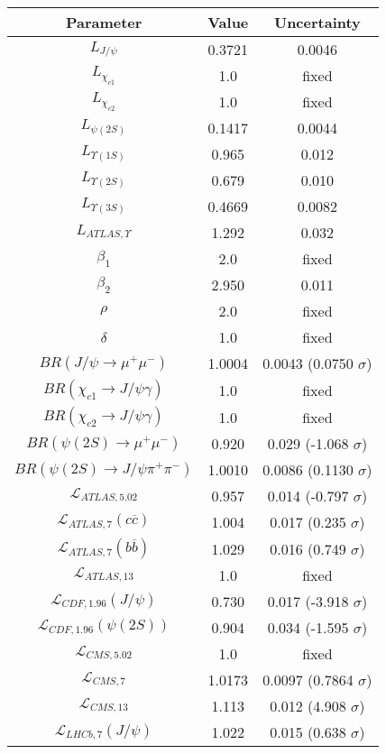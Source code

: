 \begin{table}[h!]
\centering
\begin{tabular}{c|c|c}
Parameter & Value & Uncertainty \\
\hline
$L_{J/\psi}$ & 0.3721 & 0.0046 \\
$L_{\chi_{c1}}$ & 1.0 & fixed \\
$L_{\chi_{c2}}$ & 1.0 & fixed \\
$L_{\psi(2S)}$ & 0.1417 & 0.0044 \\
$L_{\Upsilon(1S)}$ & 0.965 & 0.012 \\
$L_{\Upsilon(2S)}$ & 0.679 & 0.010 \\
$L_{\Upsilon(3S)}$ & 0.4669 & 0.0082 \\
$L_{ATLAS,\Upsilon}$ & 1.292 & 0.032 \\
$\beta_1$ & 2.0 & fixed \\
$\beta_2$ & 2.950 & 0.011 \\
$\rho$ & 2.0 & fixed \\
$\delta$ & 1.0 & fixed \\
$BR(J/\psi\rightarrow\mu^+\mu^-)$ & 1.0004 & 0.0043 (0.0750 $\sigma$) \\
$BR(\chi_{c1}\rightarrow J/\psi\gamma)$ & 1.0 & fixed \\
$BR(\chi_{c2}\rightarrow J/\psi\gamma)$ & 1.0 & fixed \\
$BR(\psi(2S)\rightarrow\mu^+\mu^-)$ & 0.920 & 0.029 (-1.068 $\sigma$) \\
$BR(\psi(2S)\rightarrow J/\psi\pi^+\pi^-)$ & 1.0010 & 0.0086 (0.1130 $\sigma$) \\
$\mathcal L_{ATLAS,5.02}$ & 0.957 & 0.014 (-0.797 $\sigma$) \\
$\mathcal L_{ATLAS,7}(c\overline c)$ & 1.004 & 0.017 (0.235 $\sigma$) \\
$\mathcal L_{ATLAS,7}(b\overline b)$ & 1.029 & 0.016 (0.749 $\sigma$) \\
$\mathcal L_{ATLAS,13}$ & 1.0 & fixed \\
$\mathcal L_{CDF,1.96}(J/\psi)$ & 0.730 & 0.017 (-3.918 $\sigma$) \\
$\mathcal L_{CDF,1.96}(\psi(2S))$ & 0.904 & 0.034 (-1.595 $\sigma$) \\
$\mathcal L_{CMS,5.02}$ & 1.0 & fixed \\
$\mathcal L_{CMS,7}$ & 1.0173 & 0.0097 (0.7864 $\sigma$) \\
$\mathcal L_{CMS,13}$ & 1.113 & 0.012 (4.908 $\sigma$) \\
$\mathcal L_{LHCb,7}(J/\psi)$ & 1.022 & 0.015 (0.638 $\sigma$) \\

\end{tabular}
\end{table}
